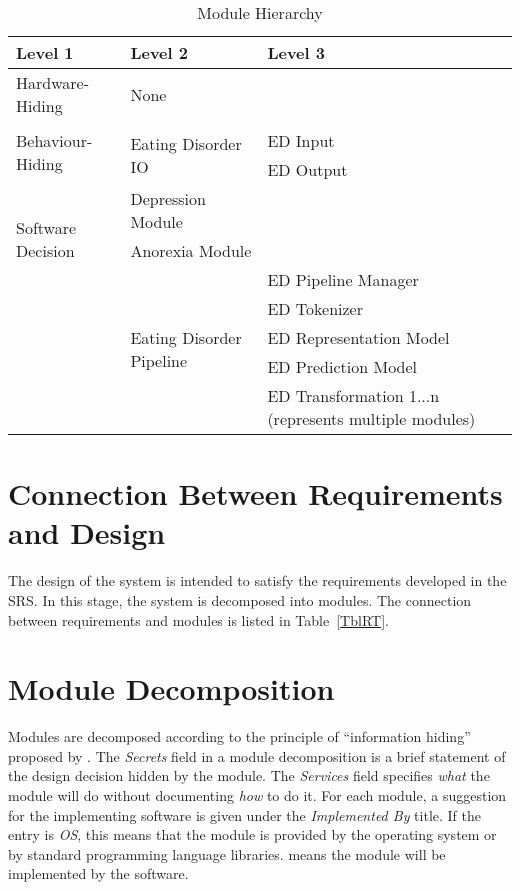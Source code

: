 \documentclass[12pt, titlepage]{article}
\begin{document}
\begin{table}[h!]
\centering
\begin{tabular}{p{} p{} p{}}
\toprule
\textbf{Level 1} & \textbf{Level 2} & \textbf{Level 3}\\
\midrule

{Hardware-Hiding} & None \\
\midrule

\multirow{3}{*}{Behaviour-Hiding} & \\ \cline{2-3}
& \multirow{2}{*}{Eating Disorder IO} & ED Input\\
& & ED Output\\
\midrule

\multirow{3}{*}{Software Decision} 
& Depression Module\\
& Anorexia Module\\ \cline{2-3}
& \multirow{5}{*}{Eating Disorder Pipeline} & ED Pipeline Manager\\
& & ED Tokenizer\\
& & ED Representation Model\\
& & ED Prediction Model\\
& & ED Transformation 1...n (represents multiple modules)\\
\bottomrule

\end{tabular}
\caption{Module Hierarchy}
\label{TblMH}
\end{table}

\newpage

\section{Connection Between Requirements and Design} \label{SecConnection}

The design of the system is intended to satisfy the requirements developed in
the SRS. In this stage, the system is decomposed into modules. The connection
between requirements and modules is listed in Table~\ref{TblRT}.

\section{Module Decomposition} \label{SecMD}

Modules are decomposed according to the principle of ``information hiding''
proposed by \citet{ParnasEtAl1984}. The \emph{Secrets} field in a module
decomposition is a brief statement of the design decision hidden by the
module. The \emph{Services} field specifies \emph{what} the module will do
without documenting \emph{how} to do it. For each module, a suggestion for the
implementing software is given under the \emph{Implemented By} title. If the
entry is \emph{OS}, this means that the module is provided by the operating
system or by standard programming language libraries.  \emph{\progname{}} means the
module will be implemented by the \progname{} software.
\end{document}
